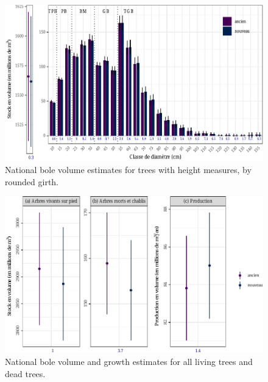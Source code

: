 \begin{figure}
	\includegraphics[scale = 0.7]{Figures/estimate_vbole_bygirth.pdf}
	\caption{National bole volume estimates for trees with height measures, by rounded girth. \label{fig::estimate_vbole_bygirth}}
\end{figure}

\begin{figure}
	\includegraphics[scale = 0.7]{Figures/estimate_vbole.pdf}
	\caption{National bole volume and growth estimates for all living trees and dead trees. \label{fig::estimate_vbole}}
\end{figure}
